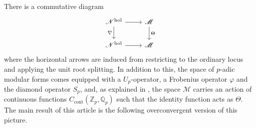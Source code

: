 \documentclass[10pt, oneside]{amsart}
\numberwithin{equation}{subsection}
\theoremstyle{definition}
\theoremstyle{remark}
\newcommand{\mbb}[1]{\mathbb{#1}}
\newcommand{\opn}[1]{\operatorname{#1}}
\begin{document}
There is a commutative diagram
\begin{equation} \label{NholToMpadicDiagram}
\begin{tikzcd}
\mathscr{N}^{\opn{hol}} \arrow[r] \arrow[d, "\nabla"'] & \mathscr{M} \arrow[d, "\Theta"] \\
\mathscr{N}^{\opn{hol}} \arrow[r]                      & \mathscr{M}                    
\end{tikzcd}
\end{equation}
where the horizontal arrows are induced from restricting to the ordinary locus and applying the unit root splitting. In addition to this, the space of $p$-adic modular forms comes equipped with a $U_p$-operator, a Frobenius operator $\varphi$ and the diamond operator $S_p$, and, as explained in \cite{howe2020unipotent}, the space $\mathscr{M}$ carries an action of continuous functions $C_{\opn{cont}}(\mbb{Z}_p, \mbb{Q}_p)$ such that the identity function acts as $\Theta$. The main result of this article is the following overconvergent version of this picture.
\end{document}
